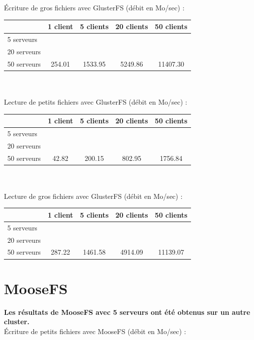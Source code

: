 \documentclass[12pt]{report}
\begin{document}
			Écriture de gros fichiers avec GlusterFS (débit en Mo/sec) :

			\begin{tabular}{|l|c|c|c|c|}
				\hline
				& 1 client & 5 clients & 20 clients & 50 clients \\
				\hline
				5 serveurs & & & & \\
				\hline
				20 serveurs & & & & \\
				\hline
				50 serveurs & 254.01 & 1533.95 & 5249.86 & 11407.30 \\
				\hline
			\end{tabular}\\\\

			Lecture de petits fichiers avec GlusterFS (débit en Mo/sec) :

			\begin{tabular}{|l|c|c|c|c|}
				\hline
				& 1 client & 5 clients & 20 clients & 50 clients \\
				\hline
				5 serveurs & & & & \\
				\hline
				20 serveurs & & & & \\
				\hline
				50 serveurs & 42.82 & 200.15 & 802.95 & 1756.84 \\
				\hline
			\end{tabular}\\\\

			Lecture de gros fichiers avec GlusterFS (débit en Mo/sec) :

			\begin{tabular}{|l|c|c|c|c|}
				\hline
				& 1 client & 5 clients & 20 clients & 50 clients \\
				\hline
				5 serveurs & & & & \\
				\hline
				20 serveurs & & & & \\
				\hline
				50 serveurs & 287.22 & 1461.58 & 4914.09 & 11139.07 \\
				\hline
			\end{tabular}

			\newpage

			\section{MooseFS}

			\textbf{Les résultats de MooseFS avec 5 serveurs ont été obtenus sur un autre cluster.}\\

			Écriture de petits fichiers avec MooseFS (débit en Mo/sec) :
\end{document}
